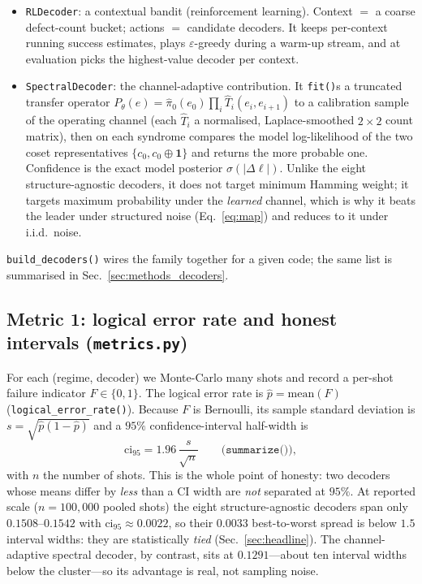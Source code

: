 \documentclass[reprint,aps,prxquantum,amsmath,amssymb,floatfix,nofootinbib,longbibliography]{revtex4-2}
\theoremstyle{definition}
\theoremstyle{remark}
\theoremstyle{plain}
\newcommand{\eps}{\varepsilon}
\begin{document}
\begin{itemize}[leftmargin=1.5em]
  \item \texttt{RLDecoder}: a contextual bandit (reinforcement learning). Context $=$ a coarse defect-count bucket; actions $=$ candidate decoders. It keeps per-context running success estimates, plays $\eps$-greedy during a warm-up stream, and at evaluation picks the highest-value decoder per context.
  \item \texttt{SpectralDecoder}: the channel-adaptive contribution. It \texttt{fit()}s a truncated transfer operator $P_\theta(e)=\hat\pi_0(e_0)\prod_i \hat T_i(e_i,e_{i+1})$ to a calibration sample of the operating channel (each $\hat T_i$ a normalised, Laplace-smoothed $2\times2$ count matrix), then on each syndrome compares the model log-likelihood of the two coset representatives $\{c_0,c_0\oplus\mathbf 1\}$ and returns the more probable one. Confidence is the exact model posterior $\sigma(|\Delta\ell|)$. Unlike the eight structure-agnostic decoders, it does not target minimum Hamming weight; it targets maximum probability under the \emph{learned} channel, which is why it beats the leader under structured noise (Eq.~\eqref{eq:map}) and reduces to it under i.i.d.\ noise.
\end{itemize}
\texttt{build\_decoders()} wires the family together for a given code; the same list is summarised in Sec.~\ref{sec:methods_decoders}.

\subsection{Metric 1: logical error rate and honest intervals (\texttt{metrics.py})}
\label{sec:si_ler}
For each (regime, decoder) we Monte-Carlo many shots and record a per-shot failure indicator $F\in\{0,1\}$. The logical error rate is $\hat p=\mathrm{mean}(F)$ (\texttt{logical\_error\_rate()}). Because $F$ is Bernoulli, its sample standard deviation is $s=\sqrt{\hat p(1-\hat p)}$ and a $95\%$ confidence-interval half-width is
\begin{equation}
  \mathrm{ci}_{95} = 1.96\,\frac{s}{\sqrt{n}} \qquad \texttt{(summarize())},
\end{equation}
with $n$ the number of shots. This is the whole point of honesty: two decoders whose means differ by \emph{less} than a CI width are \emph{not} separated at $95\%$. At reported scale ($n=100{,}000$ pooled shots) the eight structure-agnostic decoders span only $0.1508$--$0.1542$ with $\mathrm{ci}_{95}\approx0.0022$, so their $0.0033$ best-to-worst spread is below $1.5$ interval widths: they are statistically \emph{tied} (Sec.~\ref{sec:headline}). The channel-adaptive spectral decoder, by contrast, sits at $0.1291$---about ten interval widths below the cluster---so its advantage is real, not sampling noise.
\end{document}

